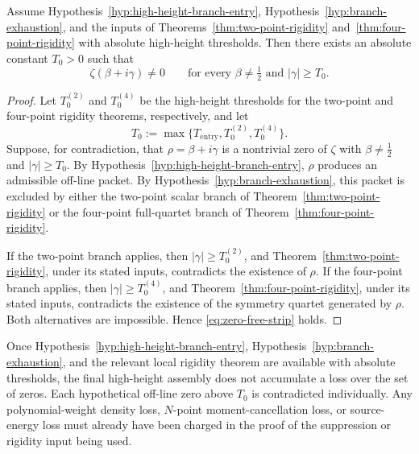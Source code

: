 \begin{theorem}
\label{thm:zero-free-strip}
Assume Hypothesis~\ref{hyp:high-height-branch-entry},
Hypothesis~\ref{hyp:branch-exhaustion}, and the inputs of
Theorems~\ref{thm:two-point-rigidity} and~\ref{thm:four-point-rigidity}
with absolute high-height thresholds.  Then there exists an absolute constant
\(T_0>0\) such that
\begin{equation}
\label{eq:zero-free-strip}
        \zeta(\beta+i\gamma)\ne 0
        \qquad
        \text{for every } \beta\ne\tfrac12 \text{ and } |\gamma|\ge T_0.
\end{equation}
\end{theorem}

\begin{proof}
Let \(T_0^{(2)}\) and \(T_0^{(4)}\) be the high-height thresholds for the
two-point and four-point rigidity theorems, respectively, and let
\[
        T_0:=\max\{T_{\mathrm{entry}},T_0^{(2)},T_0^{(4)}\}.
\]
Suppose, for contradiction, that
\(\rho=\beta+i\gamma\) is a nontrivial zero of \(\zeta\) with
\(\beta\ne\tfrac12\) and \(|\gamma|\ge T_0\).  By
Hypothesis~\ref{hyp:high-height-branch-entry}, \(\rho\) produces an
admissible off-line packet.  By Hypothesis~\ref{hyp:branch-exhaustion}, this
packet is excluded by either the two-point scalar branch of
Theorem~\ref{thm:two-point-rigidity} or the four-point full-quartet branch of
Theorem~\ref{thm:four-point-rigidity}.

If the two-point branch applies, then \(|\gamma|\ge T_0^{(2)}\), and
Theorem~\ref{thm:two-point-rigidity}, under its stated inputs, contradicts the
existence of \(\rho\).  If the four-point branch applies, then
\(|\gamma|\ge T_0^{(4)}\), and Theorem~\ref{thm:four-point-rigidity}, under
its stated inputs, contradicts the existence of the symmetry quartet generated
by \(\rho\).  Both alternatives are impossible.  Hence
\eqref{eq:zero-free-strip} holds.
\end{proof}

\begin{remark}
\label{rem:zero-free-strip-no-aggregation-loss}
Once Hypothesis~\ref{hyp:high-height-branch-entry},
Hypothesis~\ref{hyp:branch-exhaustion}, and the relevant local rigidity theorem
are available with absolute thresholds, the final high-height assembly does not
accumulate a loss over the set of zeros.  Each hypothetical off-line zero above
\(T_0\) is contradicted individually.  Any polynomial-weight density loss,
\(N\)-point moment-cancellation loss, or source-energy loss must already have
been charged in the proof of the suppression or rigidity input being used.
\end{remark}

